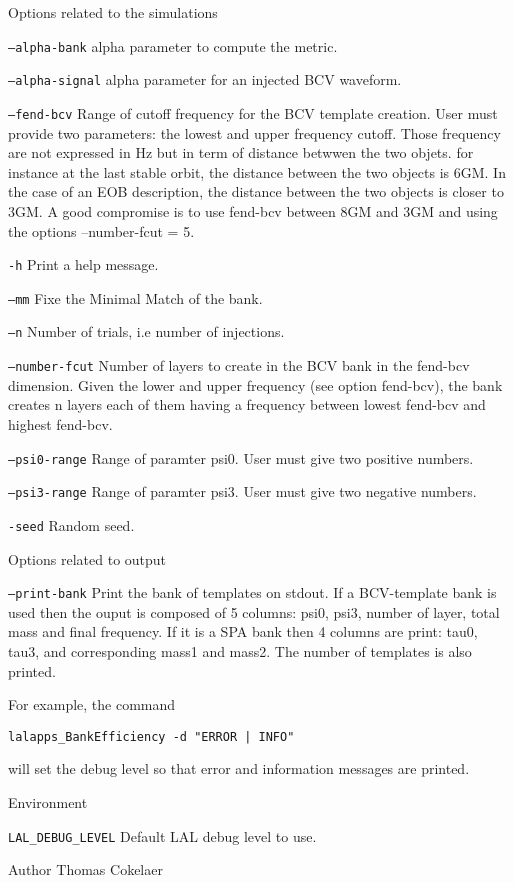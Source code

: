 \begin{entry}
\item[Options related to the simulations]\leavevmode
\begin{entry}
\item[\texttt{--alpha-bank}]
alpha parameter to compute the metric.
\item[\texttt{--alpha-signal}]
alpha parameter for an injected BCV waveform.
\item[\texttt{--fend-bcv}]
Range of cutoff frequency for the BCV template creation. User must provide two parameters: 
the lowest and upper frequency cutoff. Those frequency are not expressed in Hz but in term
of distance betwwen the two objets. for instance at the last stable orbit, the distance 
between the two objects is 6GM. In the case of an EOB description, the distance between 
the two objects is closer to 3GM. A good compromise is to use fend-bcv between 8GM and 3GM
and using the options --number-fcut = 5. 
\item[\texttt{-h}]
Print a help message.
\item[\texttt{--mm}]
Fixe the Minimal Match of the bank.
\item[\texttt{--n}]
Number of trials, i.e number of injections.
\item[\texttt{--number-fcut}]
Number of layers to create in the BCV bank in the fend-bcv dimension. 
Given the lower and upper frequency (see option fend-bcv), the bank creates
n layers each of them having a frequency between lowest fend-bcv and highest fend-bcv.
\item[\texttt{--psi0-range}]
Range of paramter psi0. User must give two positive numbers.
\item[\texttt{--psi3-range}]
Range of paramter psi3. User must give two negative numbers.
\item[\texttt{-seed}]
Random seed.
\end{entry}

\item[Options related to output]\leavevmode
\begin{entry}
\item[\texttt{--print-bank}]
Print the bank of templates on stdout. If a BCV-template bank is used then the ouput is composed of
5 columns: psi0, psi3, number of layer, total mass and final frequency. If it is a SPA bank
then 4 columns are print: tau0, tau3, and corresponding mass1 and mass2. The number of templates is 
also printed.

\end{entry}


For example, the command
\begin{indented}
\verb$lalapps_BankEfficiency -d "ERROR | INFO"$
\end{indented}
will set the debug level so that error and information messages are printed.

\item[Environment]\leavevmode

\begin{entry}
\item[\texttt{LAL\_DEBUG\_LEVEL}]
Default LAL debug level to use.
\end{entry}

\item[Author]
Thomas Cokelaer

\end{entry}
